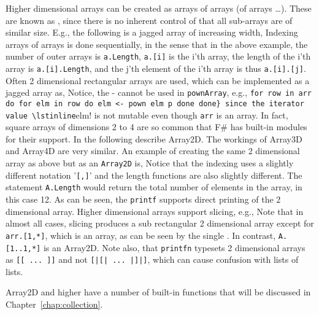 Higher dimensional arrays can be created as arrays of arrays (of arrays \dots). These are known as , since there is no inherent control of that all sub-arrays are of similar size. E.g., the following is a jagged array of increasing width,
%
%
Indexing arrays of arrays is done sequentially, in the sense that in the above example, the number of outer arrays is \lstinline|a.Length|,  \lstinline|a.[i]| is the i'th array, the length of the i'th array is \lstinline|a.[i].Length|, and the j'th element of the i'th array is thus \lstinline|a.[i].[j]|. Often 2 dimensional rectangular arrays are used, which can be implemented as a jagged array as,
%
%
Notice, the - cannot be used in \lstinline!pownArray!, e.g., \lstinline!for row in arr do for elm in row do elm <- pown elm p done done} since the iterator value \lstinline!elm! is not mutable even though \lstinline!arr! is an array.
%
In fact, square arrays of dimensions 2 to 4 are so common that F\# has built-in modules for their support. In the following describe Array2D. The workings of Array3D and Array4D are very similar. An example of creating the same 2 dimensional array as above but as an \texttt{Array2D} is,
%
%
Notice that the indexing uses a slightly different notation '\verb|[,]|' and the length functions are also slightly different. The statement \verb|A.Length| would return the total number of elements in the array, in this case 12. As can be seen, the \lstinline!printf! supports direct printing of the 2 dimensional array. Higher dimensional arrays support slicing, e.g.,
%
%
Note that in almost all cases, slicing produces a sub rectangular 2 dimensional array except for \lstinline{arr.[1,*]}, which is an array, as can be seen by the single \lexeme{[}. In contrast, \lstinline{A.[1..1,*]} is an Array2D. Note also, that \lstinline!printfn! typesets 2 dimensional arrays as \lstinline{[[ ... ]]} and not \lstinline{[|[| ... |]|]}, which can cause confusion with lists of lists.

Array2D and higher have a number of built-in functions that will be discussed in Chapter~\ref{chap:collection}.


